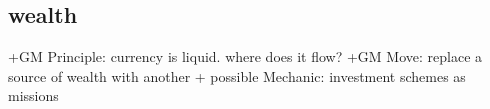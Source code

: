 \documentclass{tufte-handout}
\begin{document}
\subsection{wealth}
+GM Principle: currency is liquid. where does it flow?
+GM Move: replace a source of wealth with another	
+ possible Mechanic: investment schemes as missions 







\end{document}
